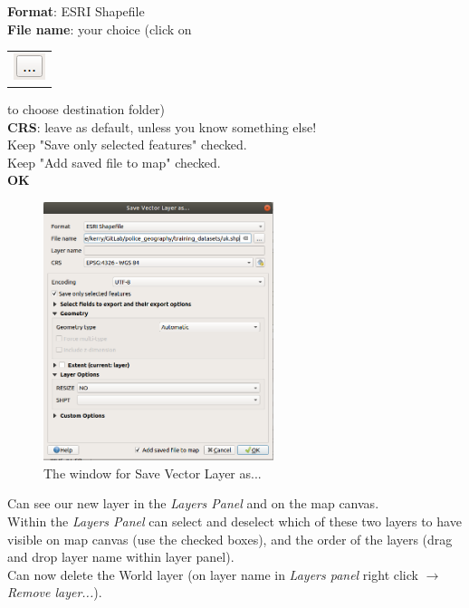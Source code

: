 \textbf{Format}: ESRI Shapefile\\
\textbf{File name}: your choice (click on \begin{tabular}{@{}c@{}}\includegraphics[width=4ex]{images/three_dots_button.png}\end{tabular} to choose destination folder)\\
\textbf{CRS}: leave as default, unless you know something else! \\
Keep "Save only selected features" checked. \\
Keep "Add saved file to map" checked. \\
\textbf{OK}\\

\begin{figure}[!h]
	\centering
	\includegraphics[width=0.6\textwidth]{images/save_as_vector_layer_form.png}%
	\caption{The window for Save Vector Layer as...}
	\label{ft_fig_firstfig3}
\end{figure}

Can see our new layer in the \textit{Layers Panel} and on the map canvas.\\

Within the \textit{Layers Panel} can select and deselect which of these two layers to have visible on map canvas (use the checked boxes), and the order of the layers (drag and drop layer name within layer panel).\\

Can now delete the World layer (on layer name in \textit{Layers panel} right click $\rightarrow$ \textit{Remove layer...}).